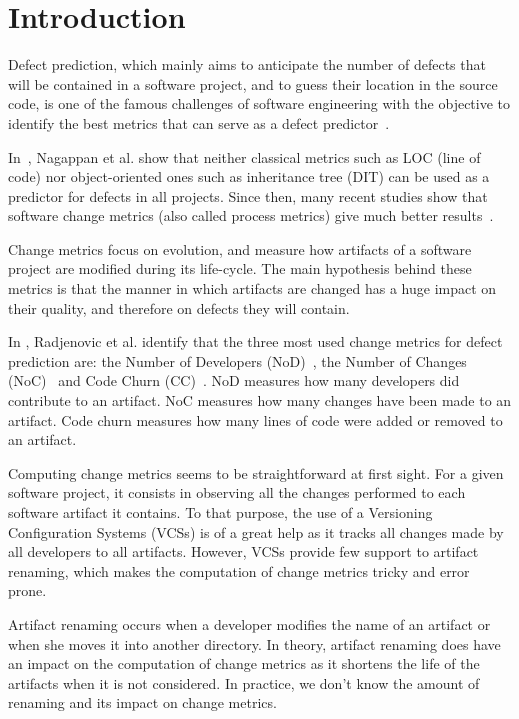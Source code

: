 \section{Introduction}
\label{sec:intro}

Defect prediction, which mainly aims to anticipate the number of defects that will be contained in a software project, and to guess their location in the source code, is one of the famous challenges of software engineering with the objective to identify the best metrics that can serve as a defect predictor~\cite{fenton_critique_1999}. 

In~\cite{nagappan_mining_2006}, Nagappan et al. show that neither classical metrics such as LOC (line of code) nor object-oriented ones such as inheritance tree (DIT) can be used as a predictor for defects in all projects. Since then, many recent studies show that software change metrics (also called process metrics) give much better results~\cite{nagappan_use_2005,weyuker_too_2008,bird_dont_2011,giger_can_2012}.

Change metrics focus on evolution, and measure how artifacts of a software project are modified during its life-cycle. The main hypothesis behind these metrics is that the manner in which artifacts are changed has a huge impact on their quality, and therefore on defects they will contain. 

In \cite{radjenovic_software_2013}, Radjenovic et al. identify that the three most used change metrics for defect prediction are: the Number of Developers (NoD)~\cite{weyuker_too_2008}, the Number of Changes (NoC)~\cite{graves_predicting_2000} and Code Churn (CC)~\cite{munson_code_1998}. NoD measures how many developers did contribute to an artifact. NoC measures how many changes have been made to an artifact. Code churn measures how many lines of code were added or removed to an artifact.

Computing change metrics seems to be straightforward at first sight. For a given software project, it consists in observing all the changes performed to each software artifact it contains. To that purpose, the use of a Versioning Configuration Systems (VCSs) is of a great help as it tracks all changes made by all developers to all artifacts. However, VCSs provide few support to artifact renaming, which makes the computation of change metrics tricky and error prone. 

Artifact renaming occurs when a developer modifies the name of an artifact or when she moves it into another directory. In theory, artifact renaming does have an impact on the computation of change metrics as it shortens the life of the artifacts when it is not considered. In practice, we don't know the amount of renaming and its impact on change metrics.

